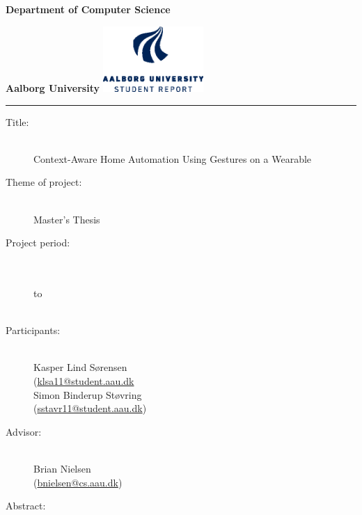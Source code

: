 {\setlength{\parindent}{0pt}
\begin{nopagebreak}
  \begin{minipage}{\textwidth}
    \vspace{2cm}
    \LARGE{\textbf{Department of Computer Science}}\vspace{-2.1cm}

    \large{\textbf{Aalborg University}}
    \hspace{8cm}\includegraphics[height=2.5cm]{images/aau_logo_en_blue.eps}
  \end{minipage}
  \vspace{0.1cm}
  \hrule

  \newcommand{\titleitem}[2]{\item[#1:] ~\\ #2 \\}
  \begin{multicols}{2}
  	\begin{description}
  		\titleitem{Title}{Context-Aware Home Automation Using Gestures on a Wearable}
  		\titleitem{Theme of project}{Master's Thesis}
  		\titleitem{Project period}{\protect{}\\ to\\ \protect\formatdate{8}{6}{2016}}
  		\titleitem{Participants}{
  			Kasper Lind Sørensen \\(\url{klsa11@student.aau.dk}\\
  			Simon Binderup Støvring \\(\url{sstavr11@student.aau.dk})
  			}
  		\titleitem{Advisor}{Brian Nielsen\\(\url{bnielsen@cs.aau.dk})}
  	\end{description}
    \vfill
    \columnbreak

    \begin{description}
    	\titleitem{Abstract}{}
    \end{description}

  \end{multicols}
\end{nopagebreak}
}